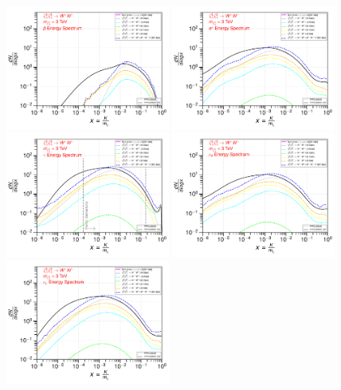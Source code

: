 \documentclass[epj,nopacs,fleqn]{svjour}
\begin{document}
\begin{figure}[!h]
	\centering
	\subfigure
	{ \includegraphics[width=0.48\textwidth]{Fig/n1ww_comparison/3000.0_antiprotons_n1ww_comparison_3000.0.pdf} } 
	\subfigure
	{\includegraphics[width=0.48\textwidth]{Fig/n1ww_comparison/3000.0_positrons_n1ww_comparison_3000.0.pdf} }
	\subfigure
	{\includegraphics[width=0.48\textwidth]{Fig/n1ww_comparison/3000.0_gammas_n1ww_comparison_3000.0.pdf} }
	\subfigure
	{\includegraphics[width=0.48\textwidth]{Fig/n1ww_comparison/3000.0_neutrinos_e_n1ww_comparison_3000.0.pdf} }
	\subfigure
	{\includegraphics[width=0.48\textwidth]{Fig/n1ww_comparison/3000.0_neutrinos_mu_n1ww_comparison_3000.0.pdf} }

\end{figure}
\end{document}

